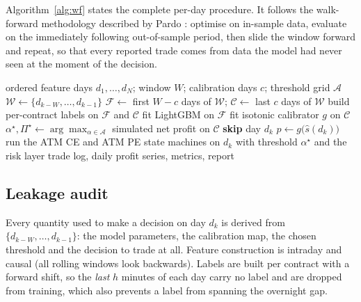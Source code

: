 \documentclass[11pt,a4paper]{article}
\begin{document}
Algorithm~\ref{alg:wf} states the complete per-day procedure. It follows the walk-forward
methodology described by Pardo \cite{pardo,wfowiki}: optimise on in-sample data,
evaluate on the immediately following out-of-sample period, then slide the window
forward and repeat, so that every reported trade comes from data the model had never
seen at the moment of the decision.

\begin{algorithm}[H]
\caption{Walk-forward evaluation with calibration, threshold search and abstention}
\label{alg:wf}
\begin{algorithmic}[1]
\Require ordered feature days $d_1,\dots,d_N$; window $W$; calibration days $c$;
threshold grid $\mathcal{A}$
  \State $\mathcal{W} \gets \{d_{k-W},\dots,d_{k-1}\}$
  \State $\mathcal{F} \gets$ first $W-c$ days of $\mathcal{W}$;\quad
         $\mathcal{C} \gets$ last $c$ days of $\mathcal{W}$
  \State build per-contract labels on $\mathcal{F}$ and $\mathcal{C}$
  \State fit LightGBM on $\mathcal{F}$
  \State fit isotonic calibrator $g$ on $\mathcal{C}$ 
  \State $\alpha^{\star}, \Pi^{\star} \gets \arg\max_{\alpha\in\mathcal{A}}$ simulated
         net profit on $\mathcal{C}$
     \State \textbf{skip} day $d_k$ 
  \Else
     \State $p \gets g\big(\hat{s}(d_k)\big)$ 
     \State run the ATM CE and ATM PE state machines on $d_k$ with threshold
            $\alpha^{\star}$ and the risk layer
  \EndIf
\EndFor
\State \Return trade log, daily profit series, metrics, report
\end{algorithmic}
\end{algorithm}

\subsection{Leakage audit}

Every quantity used to make a decision on day $d_k$ is derived from
$\{d_{k-W},\dots,d_{k-1}\}$: the model parameters, the calibration map, the chosen
threshold and the decision to trade at all. Feature construction is intraday and causal
(all rolling windows look backwards). Labels are built per contract with a forward shift,
so the \emph{last} $h$ minutes of each day carry no label and are dropped from training,
which also prevents a label from spanning the overnight gap.
\end{document}
